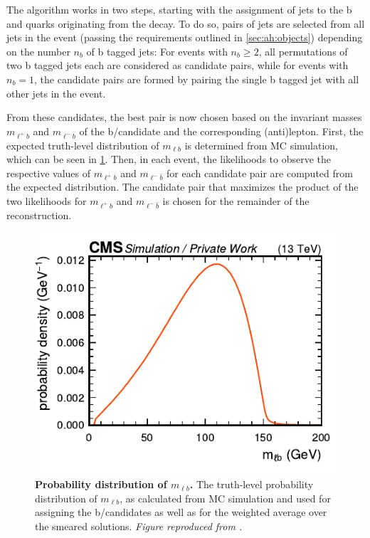 The algorithm works in two steps, starting with the assignment of jets to the b and \bbar quarks originating from the \ttbar decay. To do so, pairs of jets are selected from all jets in the event (passing the requirements outlined in \cref{sec:ah:objects}) depending on the number $n_b$ of b tagged jets: For events with $n_b \geq 2$, all permutations of two b tagged jets each are considered as candidate pairs, while for events with $n_b = 1$, the candidate pairs are formed by pairing the single b tagged jet with all other jets in the event. 

From these candidates, the best pair is now chosen based on the invariant masses $m_{\ell^+ b}$ and $m_{\ell^- \bar{b}}$ of the b/\bbar candidate and the corresponding (anti)lepton. First, the expected truth-level distribution of $m_{\ell b}$ is determined from MC simulation, which can be seen in \cref{fig:ah:kinreco_mlb}. Then, in each event, the likelihoods to observe the respective 
values of $m_{\ell^+ b}$ and $m_{\ell^- \bar{b}}$ for each candidate pair are computed from the expected distribution.
The candidate pair that maximizes the product of the two likelihoods for $m_{\ell^+ b}$ and $m_{\ell^- \bar{b}}$ is chosen for the remainder of the reconstruction.

\begin{figure}[!th]
    \centering
    \includegraphics[width=0.5\linewidth]{figures/ah/kinreco/mlb.pdf}
    \caption{\textbf{Probability distribution of $m_{\ell b}$.} The truth-level probability distribution of $m_{\ell b}$, as calculated from \ttbar MC simulation and used for assigning the b/\bbar candidates as well as for the weighted average over the smeared solutions. \textit{Figure reproduced from .}}
    \label{fig:ah:kinreco_mlb}
\end{figure}

